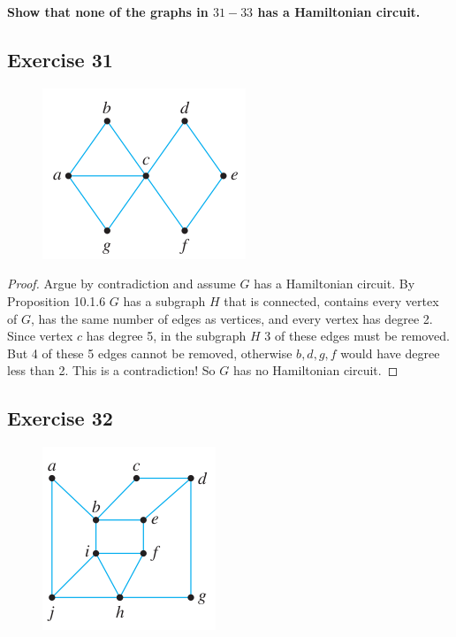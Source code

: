 \documentclass[14pt]{extarticle}
\newcommand{\cy}{\color{cyan}}
\begin{document}
{\bf \cy Show that none of the graphs in $31-33$ has a Hamiltonian circuit.}

\subsection{Exercise 31}
\begin{figure}[ht!]
\centering
\includegraphics[scale=0.6]{../images/10.1.31.png}
\end{figure}

\begin{proof}
Argue by contradiction and assume \(G\) has a Hamiltonian circuit. By Proposition 10.1.6 \(G\) has a subgraph \(H\) that
is connected, contains every vertex of \(G\), has the same number of edges as vertices, and every vertex has degree 2.
Since vertex \(c\) has degree 5, in the subgraph \(H\) 3 of these edges must be removed. But 4 of these 5 edges cannot be
removed, otherwise \(b,d,g,f\) would have degree less than 2. This is a contradiction! So \(G\) has no Hamiltonian circuit.
\end{proof}

\subsection{Exercise 32}
\begin{figure}[ht!]
\centering
\includegraphics[scale=0.6]{../images/10.1.32.png}
\end{figure}
\end{document}
